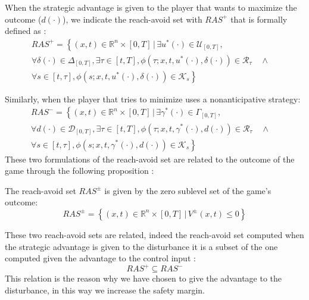 When the strategic advantage is given to the player that wants to maximize the outcome ($d(\cdot)$), we indicate the reach-avoid set with $RAS^+$ that is formally defined as \cite{new_paper}:
\begin{multline}
    \label{ras_p}
    RAS^+ = 
    \left\{
        (x,t) \in \mathbb{R}^n \times [0,T] \,|\, \exists u^*(\cdot) \in \mathcal{U}_{[0, T]},
    \right.\\
    \left.
          \forall \delta(\cdot) \in \Delta_{[0, T]}, \exists \tau \in [t, T], \phi(\tau; x, t, u^*(\cdot), \delta(\cdot)) \in \mathcal{R}_\tau \quad \wedge \quad       
    \right.\\
    \left.
        \forall s \in [t, \tau], \phi(s; x, t, u^*(\cdot), \delta(\cdot)) \in \mathcal{K}_s
    \right\}
\end{multline}

Similarly, when the player that tries to minimize uses a nonanticipative strategy:
\begin{multline}
    \label{ras_m}
    RAS^- = 
    \left\{
        (x,t) \in \mathbb{R}^n \times [0,T] \,|\, \exists \gamma^*(\cdot) \in \Gamma_{[0, T]},
    \right.\\
    \left.
          \forall d(\cdot) \in \mathcal{D}_{[0, T]}, \exists \tau \in [t, T], \phi(\tau; x, t, \gamma^*(\cdot), d(\cdot)) \in \mathcal{R}_\tau \quad \wedge \quad       
    \right.\\
    \left.
        \forall s \in [t, \tau], \phi(s; x, t, \gamma^*(\cdot), d(\cdot)) \in \mathcal{K}_s
    \right\}
\end{multline}
These two formulations of the reach-avoid set are related to the outcome of the game through the following proposition \cite{new_paper}:
\begin{prop}
    \label{ras_p_m_v}
    The reach-avoid set $RAS^\pm$ is given by the zero sublevel set of the game's outcome: 
    \[
        RAS^\pm=
        \left\{
            (x, t) \in \mathbb{R}^n \times [0, T] \,|\, V^\pm(x,t) \leq 0
        \right\}
    \]
\end{prop}
These two reach-avoid sets are related, indeed the reach-avoid set computed when the strategic advantage is given to the disturbance it is a subset of the one computed given the advantage to the control input \cite{new_paper}:
\begin{equation}
    RAS^+ \subseteq RAS^-
\end{equation}
This relation is the reason why we have chosen to give the advantage to the disturbance, in this way we increase the safety margin.

